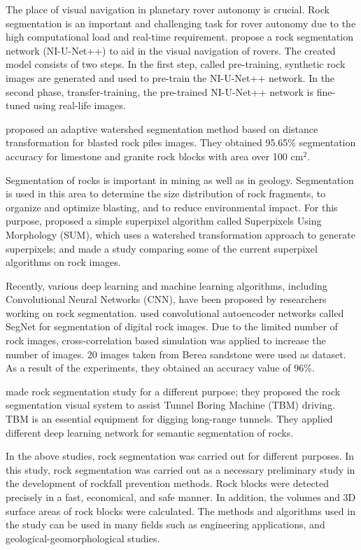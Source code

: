 \documentclass[a4paper,fleqn]{cas-sc}
\begin{document}
The place of visual navigation in planetary rover autonomy is crucial. Rock segmentation is an important and challenging task for rover autonomy due to the high computational load and real-time requirement. \cite{kuang2021rock} propose a rock segmentation network (NI-U-Net++) to aid in the visual navigation of rovers. The created model consists of two steps. In the first step, called pre-training, synthetic rock images are generated and used to pre-train the NI-U-Net++ network. In the second phase, transfer-training, the pre-trained NI-U-Net++ network is fine-tuned using real-life images.

\cite{guo2022method} proposed an adaptive watershed segmentation method based on distance transformation for blasted rock piles images. They obtained 95.65\% segmentation accuracy for limestone and granite rock blocks with area over 100 cm$^2$. 

Segmentation of rocks is important in mining as well as in geology. Segmentation is used in this area to determine the size distribution of rock fragments, to organize and optimize blasting, and to reduce environmental impact. For this purpose, \cite{malladi2014superpixels} proposed a simple superpixel algorithm called Superpixels Using Morphology (SUM), which uses a watershed transformation approach to generate superpixels; and made a study comparing some of the current superpixel algorithms on rock images.

Recently, various deep learning and machine learning algorithms, including Convolutional Neural Networks (CNN), have been proposed by researchers working on rock segmentation. \cite{karimpouli2019segmentation} used convolutional autoencoder networks called SegNet for segmentation of digital rock images. Due to the limited number of rock images, cross-correlation based simulation was applied to increase the number of images. 20 images taken from Berea sandstone were used as dataset. As a result of the experiments, they obtained an accuracy value of 96\%.

\cite{xue2021rock} made rock segmentation study for a different purpose; they proposed the rock segmentation visual system to assist Tunnel Boring Machine (TBM) driving. TBM is an essential equipment for digging long-range tunnels. They applied different deep learning network for semantic segmentation of rocks.

In the above studies, rock segmentation was carried out for different purposes. In this study, rock segmentation was carried out as a necessary preliminary study in the development of rockfall prevention methods. Rock blocks were detected precisely in a fast, economical, and safe manner. In addition, the volumes and 3D surface areas of rock blocks were calculated. The methods and algorithms used in the study can be used in many fields such as engineering applications, and geological-geomorphological studies.
\end{document}
